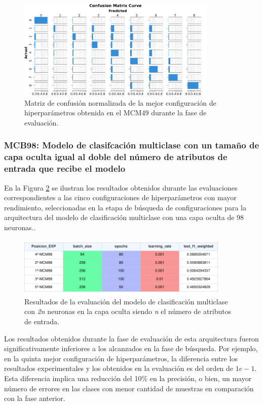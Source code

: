 \begin{figure}[H]
    \centering
    \includegraphics[width=0.85\textwidth]{./img/evaluacion/matrices_confusion/MCNorm_EVAL_MCM49.pdf}
    \caption{Matriz de confusión normalizada de la mejor configuración de hiperparámetros obtenida en el MCM49 durante la fase de evaluación.}
    \label{fig:MCNorm_EVAL_MCM49}
\end{figure}




\subsubsection{MCB98: Modelo de clasifcación multiclase con un tamaño de capa oculta igual al doble del número de atributos de entrada que recibe el modelo}
En la Figura \ref{fig:EVALMCM98} se ilustran los resultados obtenidos durante las evaluaciones correspondientes a las cinco configuraciones de hiperparámetros con mayor rendimiento, seleccionadas en la etapa de búsqueda de configuraciones para la arquitectura del modelo de clasificación multiclase con una capa oculta de 98 neuronas..

\begin{figure}[H]
    \centering
    \includegraphics[width=0.9\textwidth]{./img/evaluacion/resultados/EVALMCM98.pdf}
    \caption{Resultados de la evaluación del modelo de clasificación multiclase con \textit{2n} neuronas en la capa oculta siendo \textit{n} el número de atributos de entrada.}
    \label{fig:EVALMCM98}
\end{figure}

Los resultados obtenidos durante la fase de evaluación de esta arquitectura fueron significativamente inferiores a los alcanzados en la fase de búsqueda. Por ejemplo, en la quinta mejor configuración de hiperparámetros, la diferencia entre los resultados experimentales y los obtenidos en la evaluación es del orden de $1e-1$. Esta diferencia implica una reducción del 10\% en la precisión, o bien, un mayor número de errores en las clases con menor cantidad de muestras en comparación con la fase anterior.


